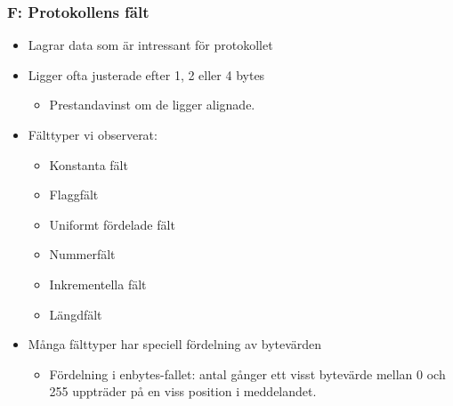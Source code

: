 \documentclass[xetex, 8pt]{beamer}
\begin{document}
    \begin{frame}
        \frametitle{F: Protokollens fält}
        \begin{itemize}
            \item Lagrar data som är intressant för protokollet
            \item Ligger ofta justerade efter 1, 2 eller 4 bytes
                \begin{itemize}
                    \item Prestandavinst om de ligger alignade.
                \end{itemize}
            \item Fälttyper vi observerat:
                \begin{itemize}
                    \item Konstanta fält
                    \item Flaggfält
                    \item Uniformt fördelade fält
                    \item Nummerfält
                    \item Inkrementella fält
                    \item Längdfält
                \end{itemize}
            \item Många fälttyper har speciell fördelning av bytevärden
                \begin{itemize}
                    \item Fördelning i enbytes-fallet: antal gånger ett visst
                        bytevärde mellan 0 och 255 uppträder på en viss position
                        i meddelandet.
                \end{itemize}
        \end{itemize}
    \end{frame}

\end{document}
